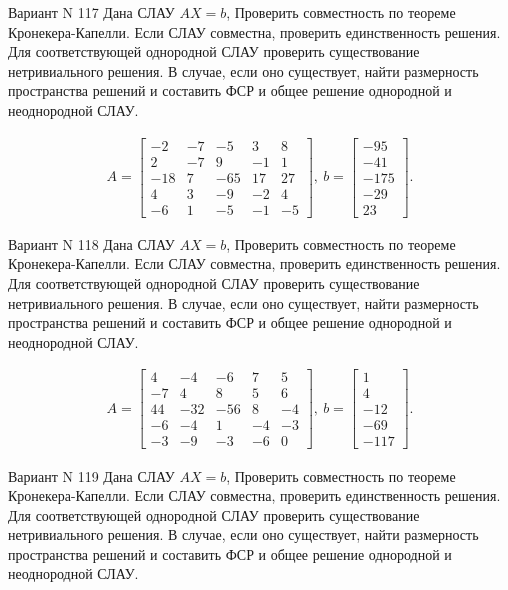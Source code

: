 \documentclass[11pt]{report}
\begin{document}
Вариант N 117
Дана СЛАУ $AX = b$,
Проверить совместность по теореме Кронекера-Капелли. Если СЛАУ совместна, проверить единственность решения.
Для соответствующей однородной СЛАУ проверить существование нетривиального решения. В случае, если оно существует,
найти размерность пространства решений и составить ФСР и общее решение однородной  и неоднородной СЛАУ.


\begin{align*}
 A = \left[\begin{matrix}-2 & -7 & -5 & 3 & 8\\2 & -7 & 9 & -1 & 1\\-18 & 7 & -65 & 17 & 27\\4 & 3 & -9 & -2 & 4\\-6 & 1 & -5 & -1 & -5\end{matrix}\right],
\ b = \left[\begin{matrix}-95\\-41\\-175\\-29\\23\end{matrix}\right]. 
 \end{align*}

Вариант N 118
Дана СЛАУ $AX = b$,
Проверить совместность по теореме Кронекера-Капелли. Если СЛАУ совместна, проверить единственность решения.
Для соответствующей однородной СЛАУ проверить существование нетривиального решения. В случае, если оно существует,
найти размерность пространства решений и составить ФСР и общее решение однородной  и неоднородной СЛАУ.


\begin{align*}
 A = \left[\begin{matrix}4 & -4 & -6 & 7 & 5\\-7 & 4 & 8 & 5 & 6\\44 & -32 & -56 & 8 & -4\\-6 & -4 & 1 & -4 & -3\\-3 & -9 & -3 & -6 & 0\end{matrix}\right],
\ b = \left[\begin{matrix}1\\4\\-12\\-69\\-117\end{matrix}\right]. 
 \end{align*}

Вариант N 119
Дана СЛАУ $AX = b$,
Проверить совместность по теореме Кронекера-Капелли. Если СЛАУ совместна, проверить единственность решения.
Для соответствующей однородной СЛАУ проверить существование нетривиального решения. В случае, если оно существует,
найти размерность пространства решений и составить ФСР и общее решение однородной  и неоднородной СЛАУ.
\end{document}
